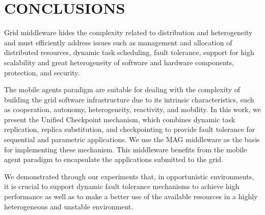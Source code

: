 \documentclass{cpeauth}
\begin{document}


\section{CONCLUSIONS}

Grid middleware hides the complexity related to distribution and
heterogeneity and must efficiently address issues such as management
and allocation of distributed resources, dynamic task scheduling, fault
tolerance, support for high scalability and great heterogeneity of software and
hardware components, protection, and security. 

The mobile agents paradigm are suitable for dealing with the complexity
of building the grid software infrastructure due to its intrinsic
characteristics, such as cooperation, autonomy, heterogeneity, reactivity, and
mobility. In this work, we present the Unified Checkpoint
mechanism, which combines dynamic task replication, replica substitution, and
checkpointing to provide fault tolerance for sequential and parametric
applications. We use the MAG middleware as the basis for implementing these
mechanism. This middleware benefits from the mobile agent paradigm to
encapsulate the applications submitted to the grid. 

We demonstrated through our experiments that, in opportunistic environments,
it is crucial to support dynamic fault tolerance mechanisms to
achieve high performance as well as to make a better use of the available
resources in a highly heterogeneous and unstable environment.
\end{document}
